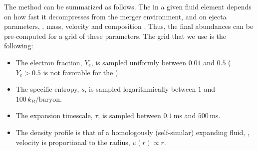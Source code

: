 The method can be summarized as follows. 
%
The \rproc{} in a given fluid element depends on how fast it decompresses from the 
merger environment, and on ejecta parameters, 
\eg, mass, velocity and composition \citep{Lippuner:2015gwa}. 
Thus, the final abundances can be pre-computed for a grid of these parameters.
The grid that we use is the following:
%
%
\begin{itemize}
    \setlength\itemsep{0.1em}
    \item The electron fraction, $Y_e$, is sampled uniformly between $0.01$ and $0.5$ 
    ($Y_e>0.5$ is not favorable for the \rproc{}).
    \item The specific entropy, $s$, is sampled logarithmically 
    between $1$ and $100\, k_B/\text{baryon}$.
    \item The expansion timescale, %
    $\tau$, is sampled between $0.1\,$ms and $500\,$ms.
    \item The density profile is that of a homologously (self-similar) expanding 
    fluid, \ie, velocity is proportional to the radius, $\upsilon(r)\propto r$.
%    
%    
\end{itemize}


